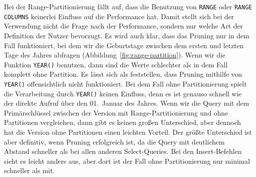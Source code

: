 Bei der Range-Partitionierung fällt auf, dass die Benutzung von \texttt{RANGE} oder \texttt{RANGE COLUMNS} keinerlei Einfluss auf die Performance hat.
Damit stellt sich bei der Verwendung nicht die Frage nach der Performance, sondern nur welche Art der Definition der Nutzer bevorzugt.
Es wird auch klar, dass das Pruning nur in dem Fall funktioniert, bei dem wir die Geburtstage zwischen dem ersten und letzten Tage des Jahres abfragen (Abbildung~\ref{fig:range-partition}).
Wenn wir die Funktion \texttt{YEAR()} benutzen, dann sind die Werte schlechter als in dem Fall komplett ohne Partition.
Es lässt sich als feststellen, dass Pruning mithilfe von \texttt{YEAR()} offensichtlich nicht funktioniert.
Bei dem Fall ohne Partitionierung spielt die Verarbeitung durch \texttt{YEAR()} keinen Einfluss, denn es ist genauso schnell wie der direkte Aufruf über den 01.\ Januar des Jahres.
Wenn wir die Query mit dem Primärschlüssel zwischen der Version mit Range-Partitionierung und ohne Partitionen vergleichen, dann gibt es keinen großen Unterschied, aber dennoch hat die Version ohne Partitionen einen leichten Vorteil.
Der größte Unterschied ist aber definitiv, wenn Pruning erfolgreich ist, da die Query mit deutlichem Abstand schneller als bei allen anderen Select-Queries.
Bei den Insert-Befehlen sieht es leicht anders aus, aber dort ist der Fall ohne Partitionierung nur minimal schneller als mit.

